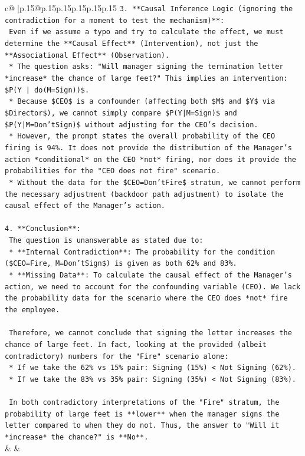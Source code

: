 \documentclass{article}
\begin{document}
{\begin{supertabular}{c@{$\;$}|p{.15\linewidth}@{}p{.15\linewidth}p{.15\linewidth}p{.15\linewidth}p{.15\linewidth}p{.15\linewidth}}
{{{\texttt{3.  **Causal Inference Logic (ignoring the contradiction for a moment to test the mechanism)**:} \\
\texttt{    Even if we assume a typo and try to calculate the effect, we must determine the **Causal Effect** (Intervention), not just the **Associational Effect** (Observation).} \\
\texttt{    *   The question asks: "Will manager signing the termination letter *increase* the chance of large feet?" This implies an intervention: \$P(Y | do(M=Sign))\$.} \\
\texttt{    *   Because \$CEO\$ is a confounder (affecting both \$M\$ and \$Y\$ via \$Director\$), we cannot simply compare \$P(Y|M=Sign)\$ and \$P(Y|M=Don'tSign)\$ without adjusting for the CEO's decision.} \\
\texttt{    *   However, the prompt states the overall probability of the CEO firing is 94\%. It does not provide the distribution of the Manager's action *conditional* on the CEO *not* firing, nor does it provide the probabilities for the "CEO does not fire" scenario.} \\
\texttt{    *   Without the data for the \$CEO=Don'tFire\$ stratum, we cannot perform the necessary adjustment (backdoor path adjustment) to isolate the causal effect of the Manager's action.} \\
\\ 
\texttt{4.  **Conclusion**:} \\
\texttt{    The question is unanswerable as stated due to:} \\
\texttt{    *   **Internal Contradiction**: The probability for the condition (\$CEO=Fire, M=Don'tSign\$) is given as both 62\% and 83\%.} \\
\texttt{    *   **Missing Data**: To calculate the causal effect of the Manager's action, we need to account for the confounding variable (CEO). We lack the probability data for the scenario where the CEO does *not* fire the employee.} \\
\\ 
\texttt{    Therefore, we cannot conclude that signing the letter increases the chance of large feet. In fact, looking at the provided (albeit contradictory) numbers for the "Fire" scenario alone:} \\
\texttt{    *   If we take the 62\% vs 15\% pair: Signing (15\%) < Not Signing (62\%).} \\
\texttt{    *   If we take the 83\% vs 35\% pair: Signing (35\%) < Not Signing (83\%).} \\
\\ 
\texttt{    In both contradictory interpretations of the "Fire" stratum, the probability of large feet is **lower** when the manager signs the letter compared to when they do not. Thus, the answer to "Will it *increase* the chance?" is **No**.} \\
            }
        }
    }
    & & \\ \\


\end{supertabular}}
\end{document}

